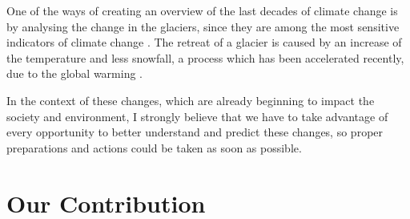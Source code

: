 \documentclass[12pt, a4paper]{report}
\begin{document}
	One of the ways of creating an overview of the last decades of climate change is by analysing the change in the glaciers, since they are among the most sensitive indicators of climate change \cite{glacier_1}. The retreat of a glacier is caused by an increase of the temperature and less snowfall, a process which has been accelerated recently, due to the global warming \cite{glacier_2}.
	
	In the context of these changes, which are already beginning to impact the society and environment, I strongly believe that we have to take advantage of every opportunity to better understand and predict these changes, so proper preparations and actions could be taken as soon as possible. 
	
	
	\section{Our Contribution}
	
\end{document}
